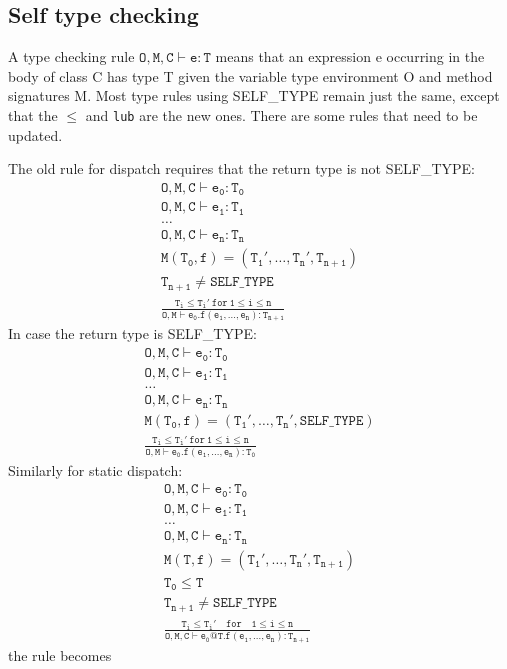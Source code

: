 \subsection{Self type checking}
A type checking rule $\mathtt{O,M,C\vdash e:T}$ means that an expression e occurring in the body of class C has type T given the variable type environment O and method signatures M. Most type rules using SELF\_TYPE remain just the same, except that the $\leq$ and \texttt{lub} are the new ones. There are some rules that need to be updated. 

The old rule for dispatch requires that the return type is not SELF\_TYPE:
\begin{gather*}
\mathtt{O,M,C\vdash e_0:T_0}\\
\mathtt{O,M,C\vdash e_1:T_1}\\
\dots\\
\mathtt{O,M,C\vdash e_n:T_n}\\
\mathtt{M(T_0,f) = (T_1',\dots,T_n', T_{n+1})}\\
\mathtt{T_{n+1}\neq SELF\_TYPE}\\
\mathtt{\frac{T_i\leq T_i'\:for\:1\leq i \leq n}{O,M\vdash e_0.f(e_1,\dots,e_n):T_{n+1}}}
\end{gather*}
In case the return type is SELF\_TYPE:
\begin{gather*}
\mathtt{O,M,C\vdash e_0:T_0}\\
\mathtt{O,M,C\vdash e_1:T_1}\\
\dots\\
\mathtt{O,M,C\vdash e_n:T_n}\\
\mathtt{M(T_0,f) = (T_1',\dots,T_n', SELF\_TYPE)}\\
\mathtt{\frac{T_i\leq T_i'\:for\:1\leq i \leq n}{O,M\vdash e_0.f(e_1,\dots,e_n):T_0}}
\end{gather*}
Similarly for static dispatch:
\begin{gather*}
\mathtt{O,M,C\vdash e_0:T_0}\\
\mathtt{O,M,C\vdash e_1:T_1}\\
\dots\\
\mathtt{O,M,C\vdash e_n:T_n}\\
\mathtt{M(T,f) = (T_1',\dots,T_n',T_{n+1})}\\
\mathtt{T_0\leq T}\\
\mathtt{T_{n+1}\neq SELF\_TYPE}\\
\mathtt{\frac{T_i\leq T_i'\quad for\quad1\leq i \leq n}{O,M,C\vdash e_0@T.f(e_1,\dots,e_n): T_{n+1}}}
\end{gather*}
the rule becomes
